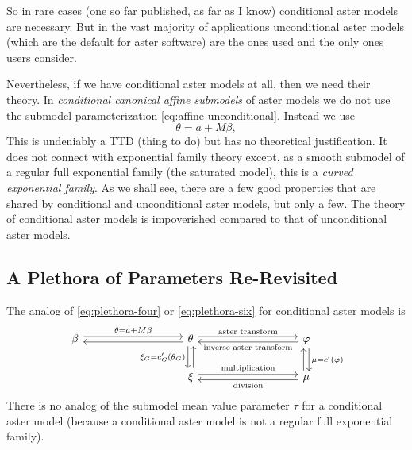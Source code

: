 So in rare cases (one so far published, as far as I know) conditional
aster models are necessary.  But in the vast majority of applications
unconditional aster models (which are the default for aster software)
are the ones used and the only ones users consider.

Nevertheless, if we have conditional aster models at all, then we need their
theory.  In \emph{conditional canonical affine submodels} of aster models
we do not use the submodel parameterization \eqref{eq:affine-unconditional}.
Instead we use
\begin{equation} \label{eq:affine-conditional}
   \theta = a + M \beta,
\end{equation}
This is undeniably a TTD (thing to do) but has no theoretical justification.
It does not connect with exponential family theory except, as a smooth
submodel of a regular full exponential family (the saturated model),
this is a \emph{curved exponential family}.
As we shall see, there are a few good properties that are shared by
conditional and unconditional aster models, but only a few.
The theory of conditional aster models is impoverished compared to that
of unconditional aster models.

\subsection{A Plethora of Parameters Re-Revisited}
\label{sec:re-revisited}

The analog of \eqref{eq:plethora-four} or \eqref{eq:plethora-six}
for conditional aster models is
\begin{equation} \label{eq:plethora-five}
\begin{tikzcd}[column sep=9em]
   \beta
   \arrow[r, "\theta = a + M \beta", shift left]
   &
   \theta
   \arrow[r, "\text{aster transform}", shift left]
   \arrow[d, "\xi_G = c_G'(\theta_G)"', shift right]
   \arrow[l, shift left]
   &
   \varphi
   \arrow[l, "\text{inverse aster transform}", shift left]
   \arrow[d, "\mu = c'(\varphi)", shift left]
   \\
   &
   \xi
   \arrow[u, shift right]
   \arrow[r, "\text{multiplication}", shift left]
   &
   \mu
   \arrow[l, "\text{division}", shift left]
   \arrow[u, shift left]
\end{tikzcd}
\end{equation}
There is no analog of the submodel mean value parameter $\tau$
for a conditional aster model (because a conditional aster model is not
a regular full exponential family).

